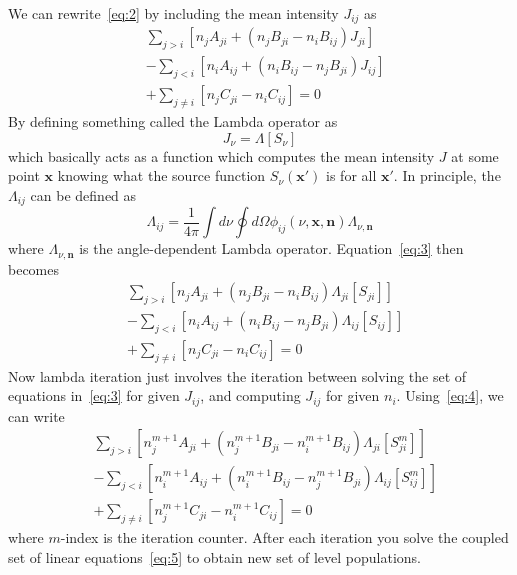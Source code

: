 \documentclass{article}
\begin{document}
We can rewrite~\ref{eq:2} by including the mean intensity \(J_{ij}\) as
\begin{equation}\label{eq:3}
    \begin{split}
        &\sum_{j > i} [n_j A_{ji} + (n_j B_{ji} - n_i B_{ij})J_{ji}] \\
        & - \sum_{j < i} [n_i A_{ij} + (n_i B_{ij} - n_j B_{ji}) J_{ij}] \\
        & + \sum_{j \neq i} [n_j C_{ji} - n_i C_{ij}] = 0
    \end{split}
\end{equation}
By defining something called the Lambda operator as
\begin{equation}
    J_{\nu} = \Lambda [S_{\nu}]
\end{equation}
which basically acts as a function which computes the mean intensity \(J\)
at some point \(\mathbf{x}\) knowing what the source function \(S_{\nu} (\mathbf{x'})\)
is for all \(\mathbf{x'}\). In principle, the \(\Lambda_{ij}\) can be defined as
\begin{equation}
    \Lambda_{ij} = \dfrac{1}{4 \pi} \int d \nu \oint d \Omega \phi_{ij}
    (\nu, \mathbf{x}, \mathbf{n}) \Lambda_{\nu, \mathbf{n}}
\end{equation}
where \(\Lambda_{\nu, \mathbf{n}}\) is the angle-dependent Lambda operator.
Equation~\ref{eq:3} then becomes
\begin{equation}\label{eq:4}
    \begin{split}
        &\sum_{j > i} [n_j A_{ji} + (n_j B_{ji} - n_i B_{ij})
        \Lambda_{ji}[S_{ji}]] \\
        & - \sum_{j < i} [n_i A_{ij} + (n_i B_{ij} - n_j B_{ji})
        \Lambda_{ij}[S_{ij}]] \\
        & + \sum_{j \neq i} [n_j C_{ji} - n_i C_{ij}] = 0
    \end{split}
\end{equation}
Now lambda iteration just involves the iteration between solving the set
of equations in~\ref{eq:3} for given \(J_{ij}\), and computing \(J_{ij}\)
for given \(n_i\). Using~\ref{eq:4}, we can write
\begin{equation}\label{eq:5}
    \begin{split}
        &\sum_{j > i} [n_j^{m+1} A_{ji} + (n_j^{m+1} B_{ji} - n_i^{m+1} B_{ij})
        \Lambda_{ji}[S_{ji}^m]] \\
        & - \sum_{j < i} [n_i^{m+1} A_{ij} + (n_i^{m+1} B_{ij} - n_j^{m+1} B_{ji})
        \Lambda_{ij}[S_{ij}^m]] \\
        & + \sum_{j \neq i} [n_j^{m+1} C_{ji} - n_i^{m+1} C_{ij}] = 0
    \end{split}
\end{equation}
where \(m\)-index is the iteration counter.  After each iteration you solve the coupled
set of linear equations~\ref{eq:5} to obtain new set of level populations.
\end{document}
